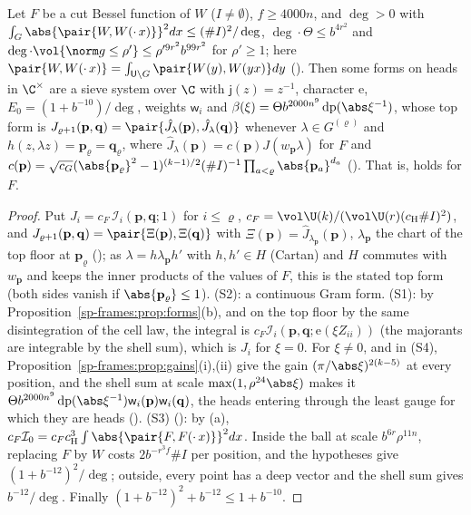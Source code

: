 \begin{theorem}
\label{sp-frames:thm:real}
Let $F$ be a cut Bessel function of $W$ ($I\ne\emptyset$), $f\ge4000n$, and $\deg>0$ with
$\int_G\abs{\pair{W,W(\cdot\,x)}}^2dx\le(\#I)^2/\deg$, $\deg\cdot\Theta\le b^{4r^2}$ and
$\deg\cdot\vol\{\norm g\le\rho'\}\le\rho'^{9r^2}b^{99r^2}$ for $\rho'\ge1$; here
$\pair{W,W(\cdot\,x)}=\int_{\mathsf U\backslash G}\pair{W(y),W(yx)}dy$ ().
Then some forms on heads in $\C^\times$ are a sieve system over $\C$ with $\mathsf j(z)=z^{-1}$, character $\mathrm e$, $E_0=(1+b^{-10})/\deg$, weights $\mathsf w_i$ and
$\beta(\xi)=\Theta b^{2000n^9}\operatorname{dp}(\abs\xi^{-1})$, whose top form is
$J_{\varrho+1}(\mathbf p,\mathbf q)=\pair{\hat J_\lambda(\mathbf p),\hat J_\lambda(\mathbf q)}$ whenever $\lambda\in G^{(\varrho)}$ and
$h(z,\lambda z)=\mathbf p_\varrho=\mathbf q_\varrho$, where $\hat J_\lambda(\mathbf p)=c(\mathbf p)J(w_{\mathbf p}\lambda)$ for $F$ and
$c(\mathbf p)=\sqrt{c_G}(\abs{\mathbf p_\varrho}^2-1)^{(k-1)/2}(\#I)^{-1}\prod_{a<\varrho}\abs{\mathbf p_a}^{d_a}$
(). That is,  holds for $F$.
\end{theorem}

\begin{proof}
Put $J_i=c_F\,\mathcal I_i(\mathbf p,\mathbf q;1)$ for $i\le\varrho$, $c_F=\vol\U(k)/(\vol\U(r)(c_{\mathrm H}\#I)^2)$, and
$J_{\varrho+1}(\mathbf p,\mathbf q)=\pair{\Xi(\mathbf p),\Xi(\mathbf q)}$ with $\Xi(\mathbf p)=\hat J_{\lambda_{\mathbf p}}(\mathbf p)$, $\lambda_{\mathbf p}$ the chart of
the top floor at $\mathbf p_\varrho$ (); as $\lambda=h\lambda_{\mathbf p}h'$ with
$h,h'\in H$ (Cartan) and $H$ commutes with $w_{\mathbf p}$ and keeps the inner products of the values of $F$,
this is the stated top form (both sides vanish if $\abs{\mathbf p_\varrho}\le1$). (S2): a continuous Gram form. (S1): by
Proposition~\ref{sp-frames:prop:forms}(b), and on the top floor by the same disintegration of the
cell law, the integral is $c_F\mathcal I_i(\mathbf p,\mathbf q;\mathrm e(\xi Z_{ii}))$ (the majorants are integrable
by the shell sum), which is $J_i$ for $\xi=0$. For $\xi\ne0$, and in (S4),
Proposition~\ref{sp-frames:prop:gains}(i),(ii) give the gain $(\pi/\abs\xi)^{2(k-5)}$ at every
position, and the shell sum at scale $\max(1,\rho^{24}\abs\xi)$ makes it
$\Theta b^{2000n^9}\operatorname{dp}(\abs\xi^{-1})\mathsf w_i(\mathbf p)\mathsf w_i(\mathbf q)$, the heads entering through the least
gauge for which they are heads (). (S3)
(): by (a),
$c_F\mathcal I_0=c_Fc_{\mathrm H}^3\int\abs{\pair{F,F(\cdot\,x)}}^2dx$. Inside the ball at scale $b^{6r}\rho^{11n}$,
replacing $F$ by $W$ costs $2b^{-r^3f}\#I$ per position, and the hypotheses give
$(1+b^{-12})^2/\deg$; outside, every point has a deep vector and the shell sum gives
$b^{-12}/\deg$. Finally $(1+b^{-12})^2+b^{-12}\le1+b^{-10}$.
\end{proof}

